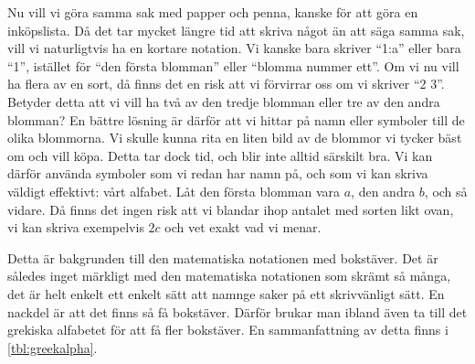 Nu vill vi göra samma sak med papper och penna, kanske för att göra en 
inköpslista.
Då det tar mycket längre tid att skriva något än att säga samma sak, vill vi 
naturligtvis ha en kortare notation.
Vi kanske bara skriver \enquote{1:a} eller bara \enquote{1}, istället för 
\enquote{den första blomman} eller \enquote{blomma nummer ett}.
Om vi nu vill ha flera av en sort, då finns det en risk att vi förvirrar oss om 
vi skriver \enquote{2 3}.
Betyder detta att vi vill ha två av den tredje blomman eller tre av den andra 
blomman?
En bättre lösning är därför att vi hittar på namn eller symboler till de olika 
blommorna.
Vi skulle kunna rita en liten bild av de blommor vi tycker bäst om och vill 
köpa.
Detta tar dock tid, och blir inte alltid särskilt bra.
Vi kan därför använda symboler som vi redan har namn på, och som vi kan skriva 
väldigt effektivt: vårt alfabet.
Låt den första blomman vara \(a\), den andra \(b\), och så vidare.
Då finns det ingen risk att vi blandar ihop antalet med sorten likt ovan, vi 
kan skriva exempelvis \(2c\) och vet exakt vad vi menar.

Detta är bakgrunden till den matematiska notationen med bokstäver.
Det är således inget märkligt med den matematiska notationen som skrämt så 
många, det är helt enkelt ett enkelt sätt att namnge saker på ett skrivvänligt 
sätt.
En nackdel är att det finns så få bokstäver.
Därför brukar man ibland även ta till det grekiska alfabetet för att få fler 
bokstäver.
En sammanfattning av detta finns i \cref{tbl:greekalpha}.

